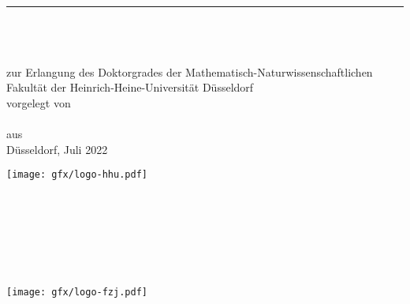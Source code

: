 \begin{titlepage}
	\flushright
	\hfill
	\vfill
	{\LARGE\thesisTitle \par}
	\rule[5pt]{\textwidth}{.4pt} \par
	{\Large\thesisName}
	\vfill
	\textit{\large\thesisDate} %
\end{titlepage}
%
%
\begin{titlepage}
	\tgherosfont
	\centering
	\phantom{}\\[0mm]
	\vfill
	{\Huge \color{ctcolortitle}\textbf{\thesisTitle} \\[25mm]}
	{\LARGE \thesisSubject} \\[20mm]
	{\Large zur Erlangung des Doktorgrades	der Mathematisch-Naturwissenschaftlichen Fakultät der Heinrich-Heine-Universität Düsseldorf} \\[15mm]
	{\Large vorgelegt von} \\[5mm]
	{\Large \thesisName} \\[0mm]
	{\small aus \thesisBirthPlace} \\[30mm]
	{\Large D{\"u}sseldorf, Juli 2022}
	\vfill
\end{titlepage}
%
%
% 
\begin{minipage}[t]{6.475cm}
	\texttt{[image: gfx/logo-hhu.pdf]} \\[5mm]
	\textbf{\thesisUniversity} \\
	\small
	\thesisUniversityDepartment \\
	\thesisUniversityStreetAddress \\
	\thesisUniversityPostalCode \\
	\phantom{} \\
	\phantom{} \\
	\phantom{}
\end{minipage}
\hspace*{1.02303cm}%
\begin{minipage}[t]{6.475cm}
	\texttt{[image: gfx/logo-fzj.pdf]} \\[5mm]
	\textbf{\thesisInstitute} \\
	\small
	\thesisInstituteDepartment \\
	\thesisInstituteInstitute \\
	\thesisInstituteGroup \\
	\thesisInstituteStreetAddress \\
	\thesisInstitutePostalCode 
\end{minipage}
